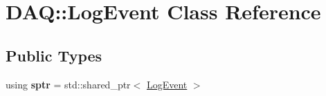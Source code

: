 \hypertarget{classDAQ_1_1LogEvent}{}\section{D\+AQ\+:\+:Log\+Event Class Reference}
\label{classDAQ_1_1LogEvent}
\subsection*{Public Types}
\begin{DoxyCompactItemize}
\item 
\mbox{\label{classDAQ_1_1LogEvent_afa24447b92b84a03f21c3083db4a7986}} 
using {\bfseries sptr} = std\+::shared\+\_\+ptr$<$ \hyperlink{classDAQ_1_1LogEvent}{Log\+Event} $>$
\end{DoxyCompactItemize}
